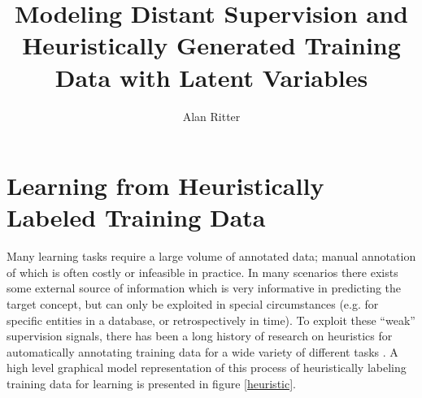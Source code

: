 \documentclass[12pt]{article}
\begin{document}
\date{}
\title{Modeling Distant Supervision and Heuristically Generated Training Data with Latent Variables}
\author{Alan Ritter}
\maketitle



\section{Learning from Heuristically Labeled Training Data}
Many learning tasks require a large volume of annotated data; manual annotation of which is often costly or infeasible in practice.
In many scenarios there exists some external source of information which is very informative in predicting the target concept, but
can only be exploited in special circumstances (e.g. for specific entities in a database, or retrospectively in time).
To exploit these ``weak'' supervision signals, there has been a long history of research on heuristics for automatically annotating training data
for a wide variety of different tasks \citep{Agichtein01,Carlson10,Weld09,mintz09}.
A high level graphical model representation of this process of heuristically labeling training data for learning is presented in figure \ref{heuristic}.
\end{document}
